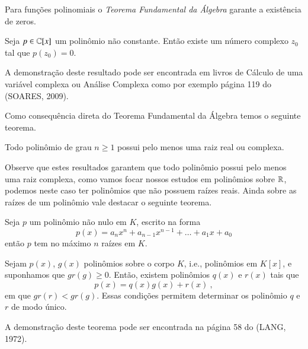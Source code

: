   Para funções polinomiais o \emph{Teorema Fundamental da Álgebra} garante a existência de zeros.
  
  \begin{teo}
  Seja $p \in \mathbb{C}[x]$ um polinômio não constante. Então existe um número complexo $z_0$ tal que $p(z_0)=0$.
  \end{teo}
  
  \begin{dem}
  A demonstração deste resultado pode ser encontrada em livros de Cálculo de uma variável complexa ou Análise Complexa como por exemplo página 119 do (SOARES, 2009).
  \end{dem}
  
  Como consequência direta do Teorema Fundamental da Álgebra temos o seguinte teorema.
  
  \begin{teo}
  Todo polinômio de grau $n \geq 1$ possui pelo menos uma raiz real ou complexa.
  \end{teo}
  
 Observe que estes resultados garantem que todo polinômio possui pelo menos uma raiz complexa, como vamos focar nossos estudos em polinômios sobre $\mathbb{R}$, podemos neste caso ter polinômios que não possuem raízes reais. Ainda sobre as raízes de um polinômio vale destacar o seguinte teorema.
 
 \begin{teo}
  Seja $p$ um polinômio não nulo em $K$, escrito na forma
  \[p(x)= a_nx^n + a_{n-1}x^{n-1}+ \ldots + a_1x+ a_0\]
   então $p$ tem no máximo $n$ raízes em $K$. 
 \end{teo}
 
 \begin{teo}
  Sejam $p(x)$, $g(x)$ polinômios sobre o corpo $K$, i.e., polinômios em $K[x]$, e suponhamos que $gr(g) \geq 0$. Então, existem polinômios $q(x)$ e $r(x)$ tais que
  \[p(x)= q(x)g(x) + r(x) \ , \]
  em que $gr(r) < gr (g)$. Essas condições permitem determinar os polinômio $q$ e $r$ de modo único.
 \end{teo}

 \begin{dem}
 A demonstração deste teorema pode ser encontrada na página 58 do (LANG, 1972).
 \end{dem}


